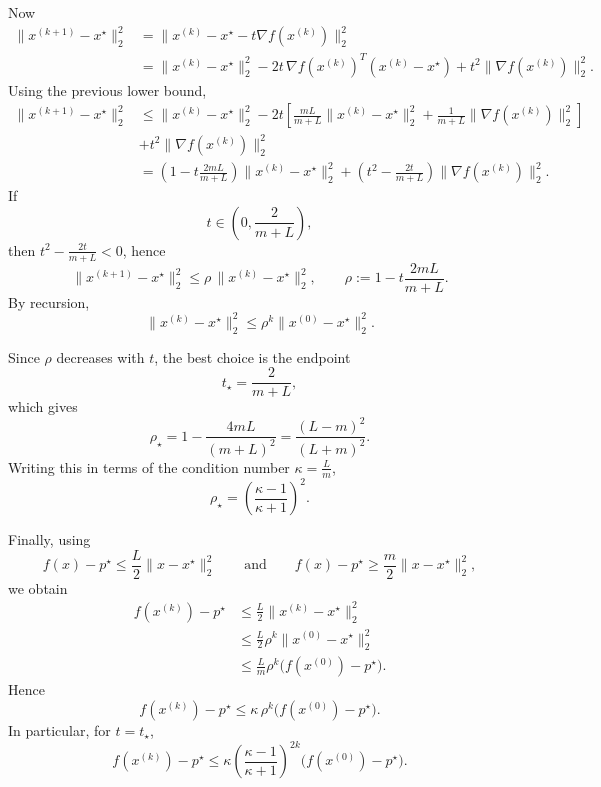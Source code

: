 \documentclass[11pt,letter,notitlepage]{article}
\theoremstyle{definition}
\begin{document}
\begin{solution}
\begin{enumerate}[label=(\alph*)]
    Now
    \[
    \begin{aligned}
    \|x^{(k+1)}-x^\star\|_2^2
    &=
    \|x^{(k)}-x^\star-t\nabla f(x^{(k)})\|_2^2\\
    &=
    \|x^{(k)}-x^\star\|_2^2
    -2t\,\nabla f(x^{(k)})^T(x^{(k)}-x^\star)
    +t^2\|\nabla f(x^{(k)})\|_2^2.
    \end{aligned}
    \]
    Using the previous lower bound,
    \[
    \begin{aligned}
    \|x^{(k+1)}-x^\star\|_2^2
    &\le
    \|x^{(k)}-x^\star\|_2^2
    -2t\left[
    \frac{mL}{m+L}\|x^{(k)}-x^\star\|_2^2
    +
    \frac{1}{m+L}\|\nabla f(x^{(k)})\|_2^2
    \right]\\
    &+t^2\|\nabla f(x^{(k)})\|_2^2\\
    &=
    \left(1-t\frac{2mL}{m+L}\right)\|x^{(k)}-x^\star\|_2^2
    +
    \left(t^2-\frac{2t}{m+L}\right)\|\nabla f(x^{(k)})\|_2^2.
    \end{aligned}
    \]
    If
    \[
    t\in\left(0,\frac{2}{m+L}\right),
    \]
    then $t^2-\frac{2t}{m+L}<0$, hence
    \[
    \|x^{(k+1)}-x^\star\|_2^2
    \le
    \rho\,\|x^{(k)}-x^\star\|_2^2,
    \qquad
    \rho:=1-t\frac{2mL}{m+L}.
    \]
    By recursion,
    \[
    \|x^{(k)}-x^\star\|_2^2
    \le
    \rho^k\|x^{(0)}-x^\star\|_2^2.
    \]

    Since $\rho$ decreases with $t$, the best choice is the endpoint
    \[
    t_\star=\frac{2}{m+L},
    \]
    which gives
    \[
    \rho_\star
    =
    1-\frac{4mL}{(m+L)^2}
    =
    \frac{(L-m)^2}{(L+m)^2}.
    \]
    Writing this in terms of the condition number $\kappa=\frac{L}{m}$,
    \[
    \rho_\star
    =
    \left(\frac{\kappa-1}{\kappa+1}\right)^2.
    \]

    Finally, using
    \[
    f(x)-p^\star\le \frac{L}{2}\|x-x^\star\|_2^2
    \qquad\text{and}\qquad
    f(x)-p^\star\ge \frac{m}{2}\|x-x^\star\|_2^2,
    \]
    we obtain
    \[
    \begin{aligned}
    f(x^{(k)})-p^\star
    &\le
    \frac{L}{2}\|x^{(k)}-x^\star\|_2^2\\
    &\le
    \frac{L}{2}\rho^k\|x^{(0)}-x^\star\|_2^2\\
    &\le
    \frac{L}{m}\rho^k\bigl(f(x^{(0)})-p^\star\bigr).
    \end{aligned}
    \]
    Hence
    \[
    f(x^{(k)})-p^\star
    \le
    \kappa\,\rho^k\bigl(f(x^{(0)})-p^\star\bigr).
    \]
    In particular, for $t=t_\star$,
    \[
    f(x^{(k)})-p^\star
    \le
    \kappa\left(\frac{\kappa-1}{\kappa+1}\right)^{2k}\bigl(f(x^{(0)})-p^\star\bigr).
    \]


\end{enumerate}
\end{solution}
\end{document}
